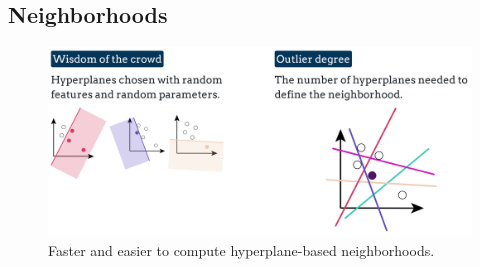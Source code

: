 \subsection{Neighborhoods}

\begin{figure}[htbp]
   \centering
   \includegraphics{images/06/hyperplanes.png}
   \caption{Faster and easier to compute hyperplane-based neighborhoods.}
   \label{fig:06/hyperplanes}
\end{figure}

